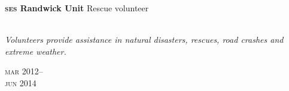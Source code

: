\begin{minipage}[t]{0.75\textwidth}
\textbf{\textsc{ses} Randwick Unit}\phantom{..} Rescue volunteer\\
\\
{\small
\textit{Volunteers provide assistance in natural disasters, rescues, road crashes and extreme weather.}
\par}
\end{minipage}
\begin{minipage}[t]{0.25\textwidth}
{
\hfill \textsc{mar} 2012--\\ 
\hspace*{0pt} \hfill \textsc{jun} 2014
\par
}
\end{minipage}



